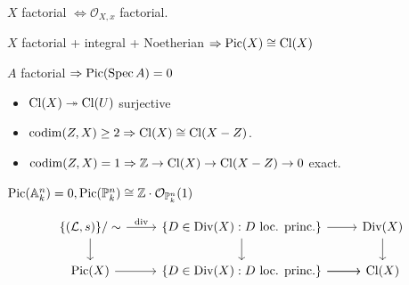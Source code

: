 \begin{definition}
$X$ factorial $ \Leftrightarrow \mathcal{O}_{X,x} $ factorial.
\end{definition}

\begin{proposition}
$X$ factorial + integral + Noetherian $ \Rightarrow \operatorname{Pic}(X) \cong \operatorname{Cl}(X)$
\end{proposition}

\begin{proposition} $A$ factorial $ \Rightarrow \operatorname{Pic}(\operatorname{Spec} A) = 0 $
\end{proposition}

\begin{proposition}
\begin{itemize}[topsep=-6pt, itemsep=0pt]
    \item $\operatorname{Cl}(X) \twoheadrightarrow  \operatorname{Cl}(U)$ surjective
    \item $\operatorname{codim} (Z, X) \geq 2 \Rightarrow \operatorname{Cl}(X) \cong \operatorname{Cl}(X-Z)$.
    \item $\operatorname{codim} (Z, X) = 1 \Rightarrow  \mathbb{Z} \to \operatorname{Cl}(X) \to \operatorname{Cl}(X-Z) \to 0$ exact.
\end{itemize}
\end{proposition}

\begin{proposition} $\operatorname{Pic}(\mathbb{A}^n_k) = 0, \operatorname{Pic}(\mathbb{P}^n_k) \cong \mathbb{Z} \cdot \mathcal{O}_{\mathbb{P}_k^n}(1) $
\end{proposition}

\[\begin{tikzcd}
	{\{(\mathcal{L},s)\}/\sim} & {\{D \in \text{Div}(X): D \text{ loc. princ.}\}} & {\text{Div}(X)} \\
	{\text{Pic}(X)} & {\{D \in \text{Div}(X): D \text{ loc. princ.}\}} & {\text{Cl}(X)}
	\arrow["{\text{div}}", from=1-1, to=1-2]
	\arrow[from=1-1, to=2-1]
	\arrow[from=1-2, to=1-3]
	\arrow[from=1-2, to=2-2]
	\arrow[from=2-1, to=2-2]
	\arrow[from=2-2, to=2-3]
	\arrow[from=2-2, to=2-3]
	\arrow[from=1-3, to=2-3]
\end{tikzcd}\]


